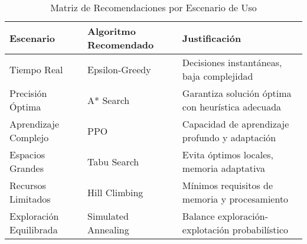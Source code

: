 \begin{table}[H]
\centering
\caption{Matriz de Recomendaciones por Escenario de Uso}
\label{tab:algorithm_recommendations}
\begin{tabular}{|l|l|l|}
\hline
\textbf{Escenario} & \textbf{Algoritmo Recomendado} & \textbf{Justificación} \\
\hline
Tiempo Real & Epsilon-Greedy & Decisiones instantáneas, baja complejidad \\
\hline
Precisión Óptima & A* Search & Garantiza solución óptima con heurística adecuada \\
\hline
Aprendizaje Complejo & PPO & Capacidad de aprendizaje profundo y adaptación \\
\hline
Espacios Grandes & Tabu Search & Evita óptimos locales, memoria adaptativa \\
\hline
Recursos Limitados & Hill Climbing & Mínimos requisitos de memoria y procesamiento \\
\hline
Exploración Equilibrada & Simulated Annealing & Balance exploración-explotación probabilístico \\
\hline
\end{tabular}
\end{table}
